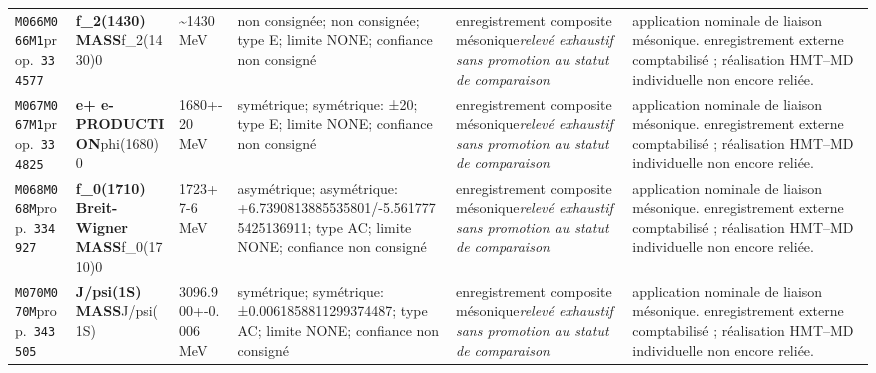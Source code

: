 \begin{landscape}
\begin{longtable}{L{1.85cm}L{4.45cm}L{2.35cm}L{4.05cm}L{3.35cm}L{7.15cm}}
\texttt{M066}\newline \texttt{M066M1}\newline prop.\ \texttt{334577} & \textbf{f\_\allowbreak{}2(1430) MASS}\newline f\_\allowbreak{}2(1430)0 & \textasciitilde{}1430\,MeV & non consignée; non consignée; type E; limite NONE; confiance non consigné & enregistrement composite mésonique\newline \emph{relevé exhaustif sans promotion au statut de comparaison} & application nominale de liaison mésonique. enregistrement externe comptabilisé ; réalisation HMT--MD individuelle non encore reliée. \\
\texttt{M067}\newline \texttt{M067M1}\newline prop.\ \texttt{334825} & \textbf{e+ e- PRODUCTION}\newline phi(1680)0 & 1680+-20\,MeV & symétrique; symétrique: ±20; type E; limite NONE; confiance non consigné & enregistrement composite mésonique\newline \emph{relevé exhaustif sans promotion au statut de comparaison} & application nominale de liaison mésonique. enregistrement externe comptabilisé ; réalisation HMT--MD individuelle non encore reliée. \\
\texttt{M068}\newline \texttt{M068M}\newline prop.\ \texttt{334927} & \textbf{f\_\allowbreak{}0(1710) Breit-Wigner MASS}\newline f\_\allowbreak{}0(1710)0 & 1723+7-6\,MeV & asymétrique; asymétrique: +6.7390813885535801/-5.5617775425136911; type AC; limite NONE; confiance non consigné & enregistrement composite mésonique\newline \emph{relevé exhaustif sans promotion au statut de comparaison} & application nominale de liaison mésonique. enregistrement externe comptabilisé ; réalisation HMT--MD individuelle non encore reliée. \\
\texttt{M070}\newline \texttt{M070M}\newline prop.\ \texttt{343505} & \textbf{J/psi(1S) MASS}\newline J/psi(1S) & 3096.900+-0.006\,MeV & symétrique; symétrique: ±0.0061858811299374487; type AC; limite NONE; confiance non consigné & enregistrement composite mésonique\newline \emph{relevé exhaustif sans promotion au statut de comparaison} & application nominale de liaison mésonique. enregistrement externe comptabilisé ; réalisation HMT--MD individuelle non encore reliée. \\

\end{longtable}
\end{landscape}

